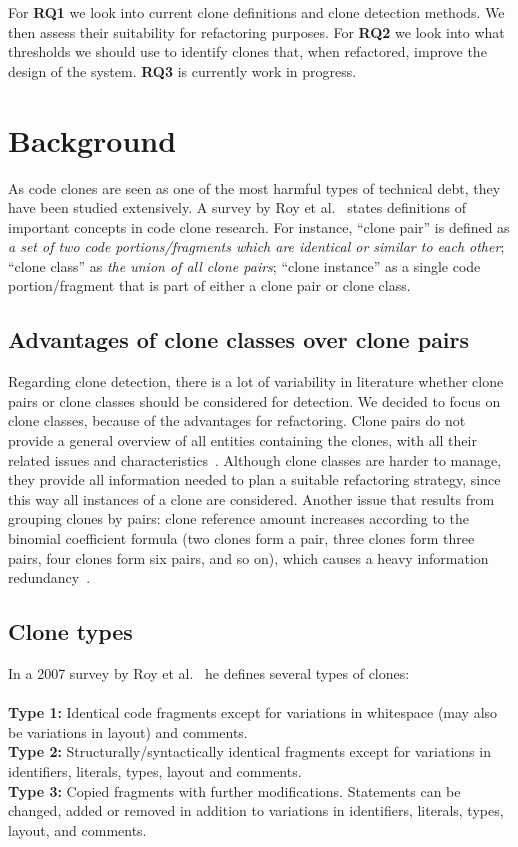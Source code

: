\documentclass[a4paper]{article}
\begin{document}
For \textbf{RQ1} we look into current clone definitions and clone detection methods. We then assess their suitability for refactoring purposes. For \textbf{RQ2} we look into what thresholds we should use to identify clones that, when refactored, improve the design of the system. \textbf{RQ3} is currently work in progress.

\section{Background}\label{chap:background}
As code clones are seen as one of the most harmful types of technical debt, they have been studied extensively. A survey by Roy et al.~\cite{roy2007survey} states definitions of important concepts in code clone research. For instance, ``clone pair'' is defined as \textit{a set of two code portions/fragments which are identical or similar to each other}; ``clone class'' as \textit{the union of all clone pairs}; ``clone instance'' as a single code portion/fragment that is part of either a clone pair or clone class.

\subsection{Advantages of clone classes over clone pairs}\label{chap:cloneclasses}
Regarding clone detection, there is a lot of variability in literature whether clone pairs or clone classes should be considered for detection. We decided to focus on clone classes, because of the advantages for refactoring. Clone pairs do not provide a general overview of all entities containing the clones, with all their related issues and characteristics~\cite{fontana2012duplicated}. Although clone classes are harder to manage, they provide all information needed to plan a suitable refactoring strategy, since this way all instances of a clone are considered. Another issue that results from grouping clones by pairs: clone reference amount increases according to the binomial coefficient formula (two clones form a pair, three clones form three pairs, four clones form six pairs, and so on), which causes a heavy information redundancy~\cite{fontana2012duplicated}.

\subsection{Clone types}\label{chap:backgroundclonetypes}
In a 2007 survey by Roy et al.~\cite{roy2007survey} he defines several types of clones:
\\\\
\textbf{Type 1:} Identical code fragments except for variations in whitespace (may also be variations in layout) and comments.\\
\textbf{Type 2:} Structurally/syntactically identical fragments except for variations in identifiers, literals, types, layout and comments.\\
\textbf{Type 3:} Copied fragments with further modifications. Statements can be changed, added or removed in addition to variations in identifiers, literals, types, layout, and comments.\\
\end{document}
